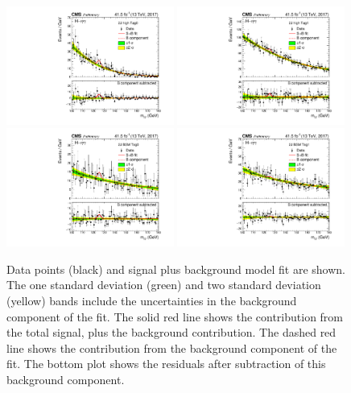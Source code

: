\begin{figure}[hptb]
  \centering
  \includegraphics[width=0.49\textwidth]{Figures/Appendices/_forAppendix2017ch2_RECO_GE2J_PTH_120_200_Tag0_13TeV.pdf}
  \includegraphics[width=0.49\textwidth]{Figures/Appendices/_forAppendix2017ch2_RECO_GE2J_PTH_120_200_Tag1_13TeV.pdf}
  \includegraphics[width=0.49\textwidth]{Figures/Appendices/_forAppendix2017ch2_RECO_GE2J_PTH_GT200_Tag0_13TeV.pdf}
  \includegraphics[width=0.49\textwidth]{Figures/Appendices/_forAppendix2017ch2_RECO_GE2J_PTH_GT200_Tag1_13TeV.pdf}
  \caption[Signal plus background fits to data.]
  {
    Data points (black) and signal plus background model fit are shown. 
    The one standard deviation (green) and two standard deviation (yellow) bands 
    include the uncertainties in the background component of the fit. 
    The solid red line shows the contribution from the total signal, plus the background contribution. 
    The dashed red line shows the contribution from the background component of the fit. 
    The bottom plot shows the residuals after subtraction of this background component.
  }
\end{figure}


